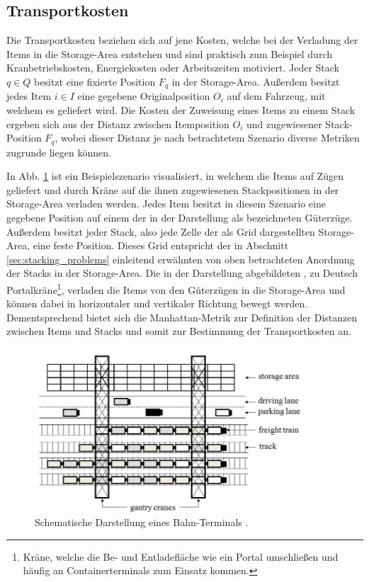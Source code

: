 \vfill
\pagebreak

\subsection{Transportkosten}
\label{sec:transport_costs}
Die Transportkosten beziehen sich auf jene Kosten, welche bei der Verladung der Items in die Storage-Area entstehen
und sind praktisch zum Beispiel durch Kranbetriebskosten, Energiekosten oder Arbeitszeiten motiviert.\newline
Jeder Stack $q \in Q$ besitzt eine fixierte Position $F_q$ in der Storage-Area.
Außerdem besitzt jedes Item $i \in I$ eine gegebene Originalposition $O_i$ auf dem Fahrzeug, mit welchem es geliefert wird.
Die Kosten der Zuweisung eines Items zu einem Stack ergeben sich aus der Distanz zwischen Itemposition $O_i$ und
zugewiesener Stack-Position $F_q$, wobei dieser Distanz je nach betrachtetem Szenario diverse Metriken zugrunde liegen können.

In Abb. \ref{fig:costs} ist ein Beispielszenario visualisiert, in welchem die Items auf Zügen geliefert und durch Kräne auf die ihnen zugewiesenen Stackpositionen in der Storage-Area verladen werden.
Jedes Item besitzt in diesem Szenario eine gegebene Position auf einem der in der Darstellung als  bezeichneten Güterzüge. Außerdem besitzt jeder Stack, also jede Zelle der als Grid dargestellten Storage-Area,
eine feste Position. Dieses Grid entspricht der in Abschnitt \ref{sec:stacking_problems} einleitend erwähnten
von oben betrachteten Anordnung der Stacks in der Storage-Area.
Die in der Darstellung abgebildeten , zu Deutsch
Portalkräne\footnote{Kräne, welche die Be- und Entladefläche wie ein Portal umschließen und häufig an
Containerterminals zum Einsatz kommen.}, verladen die Items von den Güterzügen in die
Storage-Area und können dabei in horizontaler und vertikaler Richtung bewegt werden. Dementsprechend bietet sich die Manhattan-Metrik zur Definition der Distanzen zwischen Items und Stacks und somit zur Bestimmung der Transportkosten an.

\begin{figure}[H]
\includegraphics[width=0.9\textwidth]{img/costs.png}
\caption{Schematische Darstellung eines Bahn-Terminals \cite{Briskorn2018}.}
\label{fig:costs}
\end{figure}

